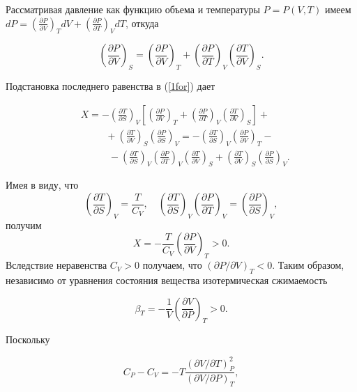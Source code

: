 \documentclass[a4paper,14pt]{article} %
\begin{document}
Рассматривая давление как функцию объема и температуры $P=P(V, T)$ имеем $d P=\left(\frac{\partial P }{ \partial V}\right)_{T}dV + \left(\frac{\partial P }{ \partial T}\right)_{V} d T$, откуда

\begin{equation*}
\left(\frac{\partial P}{\partial V}\right)_{S}=\left(\frac{\partial P}{\partial V}\right)_{T}+\left(\frac{\partial P}{\partial T}\right)_{V}\left(\frac{\partial T}{\partial V}\right)_{S}.
\end{equation*}

Подстановка последнего равенства в (\ref{1for}) дает

\begin{equation*}
\begin{aligned}
&X=-\left(\frac{\partial T}{\partial S}\right)_{V}\left[\left(\frac{\partial P}{\partial V}\right)_{T}+\left(\frac{\partial P}{\partial T}\right)_{V}\left(\frac{\partial T}{\partial V}\right)_{S}\right]+ \\
&\ \ \ \ \ \ \ \quad+\left(\frac{\partial T}{\partial V}\right)_{S}\left(\frac{\partial P}{\partial S}\right)_{V}=-\left(\frac{\partial T}{\partial S}\right)_{V}\left(\frac{\partial P}{\partial V}\right)_{T}- \\
&\ \ \ \ \ \ \ \ \ \ \ \ \ -\left(\frac{\partial T}{\partial S}\right)_{V}\left(\frac{\partial P}{\partial T}\right)_{V}\left(\frac{\partial T}{\partial V}\right)_{S}+\left(\frac{\partial T}{\partial V}\right)_{S}\left(\frac{\partial P}{\partial S}\right)_{V} .
\end{aligned}
\end{equation*}

Имея в виду, что
$$
\left(\frac{\partial T}{\partial S}\right)_{V}=\frac{T}{C_{V}}, \quad\left(\frac{\partial T}{\partial S}\right)_{V}\left(\frac{\partial P}{\partial T}\right)_{V}=\left(\frac{\partial P}{\partial S}\right)_{V},
$$
получим
$$
X=-\frac{T}{C_{V}}\left(\frac{\partial P}{\partial V}\right)_{T}>0 .
$$
Вследствие неравенства $C_{V}>0$ получаем, что $(\partial P / \partial V)_{T}<0 .$ Таким образом, независимо от уравнения состояния вещества изотермическая сжимаемость

\begin{equation*}
\beta_{T}=-\frac{1}{V}\left(\frac{\partial V}{\partial P}\right)_{T}>0.
\end{equation*}

Поскольку 

\begin{equation*}
C_{P}-C_{V}=-T \frac{(\partial V / \partial T)_{P}^{2}}{(\partial V / \partial P)_{T}},
\end{equation*}
\end{document}

